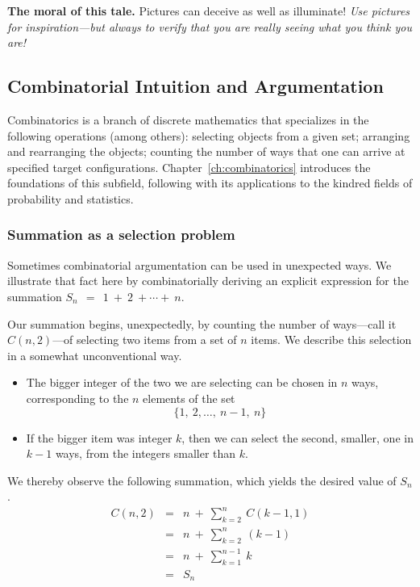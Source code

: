 \bigskip

\noindent
{\bf The moral of this tale.}  Pictures can deceive as well as illuminate!  {\em Use pictures for inspiration---but always to verify that you are really seeing what you think you are!}




\subsection{Combinatorial Intuition and Argumentation}
\label{sec:comb-proofs}

Combinatorics is a branch of discrete mathematics that specializes in the following operations (among others): selecting objects from a given set; arranging and rearranging the objects; counting the number of ways that one can arrive at specified target configurations.
Chapter~\ref{ch:combinatorics} introduces the foundations of this subfield, following with its applications to the kindred fields of probability and statistics.

\subsubsection{Summation as a selection problem}
\label{sec:comb-sum-of-first-n}

Sometimes combinatorial argumentation can be used in unexpected ways.  We illustrate that fact here by   combinatorially deriving an explicit expression for the summation
$S_n \ \ = \ \ 1 \ + \ 2 \ + \cdots + \ n$.

Our summation begins, unexpectedly, by counting the number of ways---call it $C(n,2)$---of selecting two items from a set of $n$ items.  We describe this selection in a somewhat unconventional way.
\begin{itemize}
\item
The bigger integer of the two we are selecting can be chosen in $n$ ways, corresponding to the $n$ elements of the set
\[ \{ 1, \ 2, \ldots, \ n-1, \ n \} \]
\item
If the bigger item was integer $k$, then we can select the second, smaller, one in $k-1$ ways, from the integers smaller than $k$.
\end{itemize}
We thereby observe the following summation, which yields the desired value of $S_n$.
\begin{eqnarray*}
C(n,2) & = & n \ + \ \sum_{k=2}^n \ C(k-1,1) \\
       & = & n \ + \ \sum_{k=2}^n \ (k-1) \\
       & = & n \ + \ \sum_{k=1}^{n-1} \ k \\
       & = & S_n
\end{eqnarray*}

